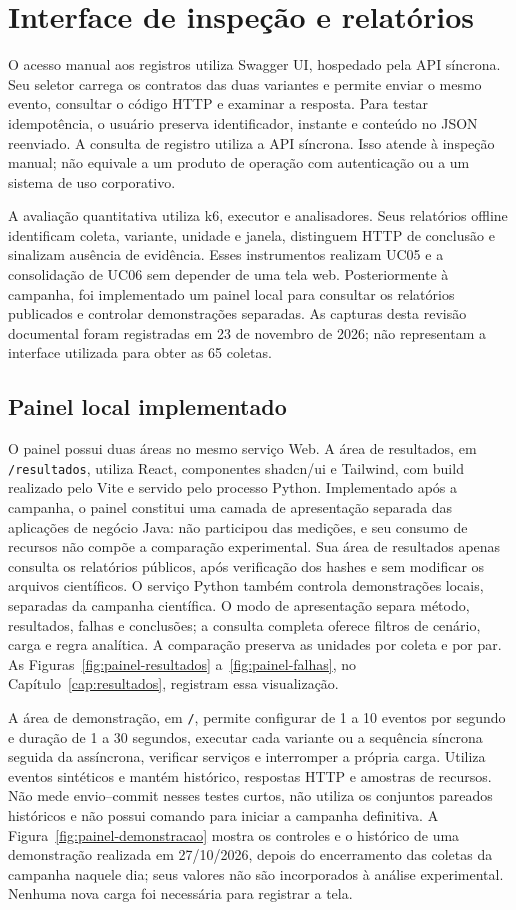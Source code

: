 \section{Interface de inspeção e relatórios}
\label{sec:interface}
O acesso manual aos registros utiliza Swagger UI, hospedado pela API síncrona. Seu seletor carrega os contratos das duas variantes e permite enviar o mesmo evento, consultar o código HTTP e examinar a resposta. Para testar idempotência, o usuário preserva identificador, instante e conteúdo no JSON reenviado. A consulta de registro utiliza a API síncrona. Isso atende à inspeção manual; não equivale a um produto de operação com autenticação ou a um sistema de uso corporativo.

A avaliação quantitativa utiliza k6, executor e analisadores. Seus relatórios offline identificam coleta, variante, unidade e janela, distinguem HTTP de conclusão e sinalizam ausência de evidência. Esses instrumentos realizam UC05 e a consolidação de UC06 sem depender de uma tela web. Posteriormente à campanha, foi implementado um painel local para consultar os relatórios publicados e controlar demonstrações separadas. As capturas desta revisão documental foram registradas em 23 de novembro de 2026; não representam a interface utilizada para obter as 65 coletas.

\subsection{Painel local implementado}
O painel possui duas áreas no mesmo serviço Web. A área de resultados, em \texttt{/resultados}, utiliza React, componentes shadcn/ui e Tailwind, com build realizado pelo Vite e servido pelo processo Python. Implementado após a campanha, o painel constitui uma camada de apresentação separada das aplicações de negócio Java: não participou das medições, e seu consumo de recursos não compõe a comparação experimental. Sua área de resultados apenas consulta os relatórios públicos, após verificação dos hashes e sem modificar os arquivos científicos. O serviço Python também controla demonstrações locais, separadas da campanha científica. O modo de apresentação separa método, resultados, falhas e conclusões; a consulta completa oferece filtros de cenário, carga e regra analítica. A comparação preserva as unidades por coleta e por par. As Figuras~\ref{fig:painel-resultados} a~\ref{fig:painel-falhas}, no Capítulo~\ref{cap:resultados}, registram essa visualização.

A área de demonstração, em \texttt{/}, permite configurar de 1 a 10 eventos por segundo e duração de 1 a 30 segundos, executar cada variante ou a sequência síncrona seguida da assíncrona, verificar serviços e interromper a própria carga. Utiliza eventos sintéticos e mantém histórico, respostas HTTP e amostras de recursos. Não mede envio--commit nesses testes curtos, não utiliza os conjuntos pareados históricos e não possui comando para iniciar a campanha definitiva. A Figura~\ref{fig:painel-demonstracao} mostra os controles e o histórico de uma demonstração realizada em 27/10/2026, depois do encerramento das coletas da campanha naquele dia; seus valores não são incorporados à análise experimental. Nenhuma nova carga foi necessária para registrar a tela.


